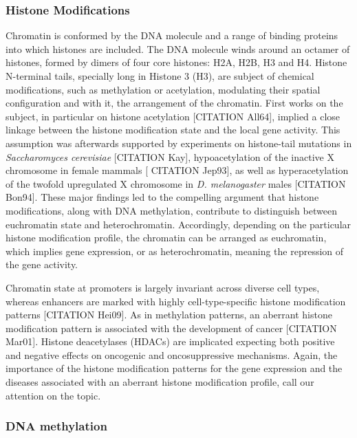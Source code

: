\subsubsection{Histone Modifications}

Chromatin is conformed by the DNA molecule and a range of binding proteins into which histones are included. The DNA molecule winds around an octamer of histones, formed by dimers of four core histones:  H2A, H2B, H3 and H4. Histone N-terminal tails, specially long in Histone 3 (H3), are subject of chemical modifications, such as methylation or acetylation, modulating their spatial configuration and with it, the arrangement of the chromatin. First works on the subject, in particular on histone acetylation [CITATION All64], implied a close linkage between the histone modification state and the local gene activity. This assumption was afterwards supported by experiments on histone-tail mutations  in \textit{Saccharomyces cerevisiae} [CITATION Kay], hypoacetylation of the inactive X chromosome in female mammals [ CITATION Jep93], as well as hyperacetylation of the twofold upregulated X chromosome in \textit{D. melanogaster} males [CITATION Bon94]. These major findings led to the compelling argument that histone modifications, along with DNA methylation, contribute to distinguish between euchromatin state and heterochromatin. Accordingly, depending on the particular histone modification profile, the chromatin can be arranged as euchromatin, which implies gene expression, or as heterochromatin, meaning the repression of the gene activity.

\medskip

Chromatin state at promoters is largely invariant across diverse cell types, whereas enhancers are marked with highly cell-type-specific histone modification patterns [CITATION Hei09]. As in methylation patterns, an aberrant histone modification pattern is associated with the development of cancer [CITATION Mar01]. Histone deacetylases (HDACs) are implicated expecting both positive and negative effects on oncogenic and oncosuppressive mechanisms. Again, the importance of the histone modification patterns for the gene expression and the diseases associated with an aberrant histone modification profile, call our attention on the topic.

\subsubsection{DNA methylation}

